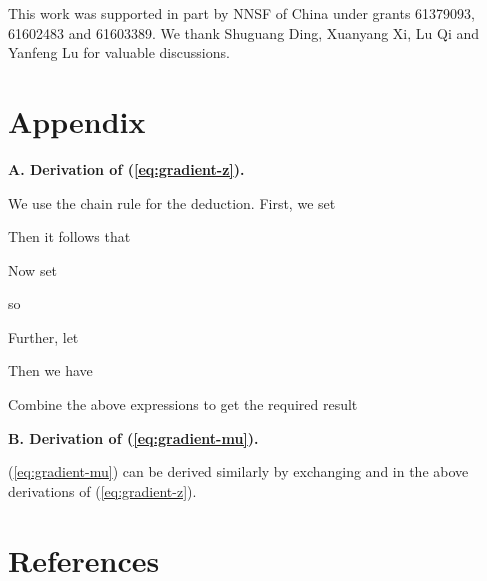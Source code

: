 \documentclass[preprint,12pt]{elsarticle}
\begin{document}
This work was supported in part by NNSF of China under grants 61379093, 61602483 and 61603389.
We thank Shuguang Ding, Xuanyang Xi, Lu Qi and Yanfeng Lu for valuable discussions.




\appendix

\section*{Appendix}

\noindent \textbf{A. Derivation of (\ref{eq:gradient-z}).}

We use the chain rule for the deduction. First, we set

Then it follows that

Now set

so

Further, let

Then we have

Combine the above expressions to get the required result


\noindent \textbf{B. Derivation of (\ref{eq:gradient-mu}).}

(\ref{eq:gradient-mu}) can be derived similarly by exchanging  and  in the above derivations
of (\ref{eq:gradient-z}).









\section*{References}
\end{document}
